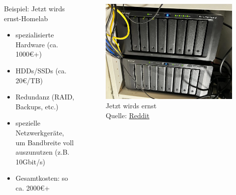 \documentclass[
    ngerman,
    accentcolor=3b,
    fontsize= 12pt,
    a4paper,
    aspectratio=169,
    colorback=true,
    fancy_row_colors,
    leqno,
    fleqn,
    boxarc=3pt,
    fleqn,
    main,
    design=2008,
]{algoslides}
\begin{document}
    \begin{frame}
        \slidehead{}
        \begin{columns}[T]
            \begin{column}{.5\textwidth}
                Beispiel: Jetzt wirds ernst-Homelab
                \begin{itemize}
                    \item spezialisierte Hardware (ca. 1000€+)
                    \item HDDs/SSDs (ca. 20€/TB)
                    \item Redundanz (RAID, Backups, etc.)
                    \item spezielle Netzwerkgeräte, um Bandbreite voll auszunutzen (z.B. 10Gbit/s)
                    \item Gesamtkosten: so ca. 2000€+
                \end{itemize}
            \end{column}%
            \begin{column}{.5\textwidth}
                \begin{figure}[ht!]
                    \centering
                    \includegraphics[height=.5\textheight]{jetzt-wirds-ernst-setup.png}
                    \caption{Jetzt wirds ernst\\Quelle: \href{https://www.reddit.com/r/synology/comments/10cxa9x/synology_networking_question_25gbe_on_the_cheap/}{Reddit}}
                    \label{fig:jetzt-wirds-ernst-homelab}
                \end{figure}
            \end{column}%
        \end{columns}
    \end{frame}
\end{document}
